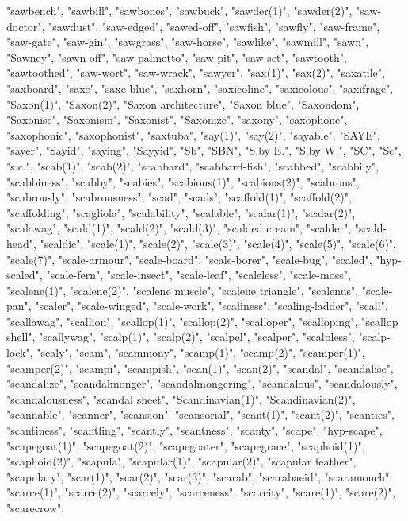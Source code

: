 "sawbench",
"sawbill",
"sawbones",
"sawbuck",
"sawder(1)",
"sawder(2)",
"saw-doctor",
"sawdust",
"saw-edged",
"sawed-off",
"sawfish",
"sawfly",
"saw-frame",
"saw-gate",
"saw-gin",
"sawgrass",
"saw-horse",
"sawlike",
"sawmill",
"sawn",
"Sawney",
"sawn-off",
"saw palmetto",
"saw-pit",
"saw-set",
"sawtooth",
"sawtoothed",
"saw-wort",
"saw-wrack",
"sawyer",
"sax(1)",
"sax(2)",
"saxatile",
"saxboard",
"saxe",
"saxe blue",
"saxhorn",
"saxicoline",
"saxicolous",
"saxifrage",
"Saxon(1)",
"Saxon(2)",
"Saxon architecture",
"Saxon blue",
"Saxondom",
"Saxonise",
"Saxonism",
"Saxonist",
"Saxonize",
"saxony",
"saxophone",
"saxophonic",
"saxophonist",
"saxtuba",
"say(1)",
"say(2)",
"sayable",
"SAYE",
"sayer",
"Sayid",
"saying",
"Sayyid",
"Sb",
"SBN",
"S.by E.",
"S.by W.",
"SC",
"Sc",
"s.c.",
"scab(1)",
"scab(2)",
"scabbard",
"scabbard-fish",
"scabbed",
"scabbily",
"scabbiness",
"scabby",
"scabies",
"scabious(1)",
"scabious(2)",
"scabrous",
"scabrously",
"scabrousness",
"scad",
"scads",
"scaffold(1)",
"scaffold(2)",
"scaffolding",
"scagliola",
"scalability",
"scalable",
"scalar(1)",
"scalar(2)",
"scalawag",
"scald(1)",
"scald(2)",
"scald(3)",
"scalded cream",
"scalder",
"scald-head",
"scaldic",
"scale(1)",
"scale(2)",
"scale(3)",
"scale(4)",
"scale(5)",
"scale(6)",
"scale(7)",
"scale-armour",
"scale-board",
"scale-borer",
"scale-bug",
"scaled",
"hyp-scaled",
"scale-fern",
"scale-insect",
"scale-leaf",
"scaleless",
"scale-moss",
"scalene(1)",
"scalene(2)",
"scalene muscle",
"scalene triangle",
"scalenus",
"scale-pan",
"scaler",
"scale-winged",
"scale-work",
"scaliness",
"scaling-ladder",
"scall",
"scallawag",
"scallion",
"scallop(1)",
"scallop(2)",
"scalloper",
"scalloping",
"scallop shell",
"scallywag",
"scalp(1)",
"scalp(2)",
"scalpel",
"scalper",
"scalpless",
"scalp-lock",
"scaly",
"scam",
"scammony",
"scamp(1)",
"scamp(2)",
"scamper(1)",
"scamper(2)",
"scampi",
"scampish",
"scan(1)",
"scan(2)",
"scandal",
"scandalise",
"scandalize",
"scandalmonger",
"scandalmongering",
"scandalous",
"scandalously",
"scandalousness",
"scandal sheet",
"Scandinavian(1)",
"Scandinavian(2)",
"scannable",
"scanner",
"scansion",
"scansorial",
"scant(1)",
"scant(2)",
"scanties",
"scantiness",
"scantling",
"scantly",
"scantness",
"scanty",
"scape",
"hyp-scape",
"scapegoat(1)",
"scapegoat(2)",
"scapegoater",
"scapegrace",
"scaphoid(1)",
"scaphoid(2)",
"scapula",
"scapular(1)",
"scapular(2)",
"scapular feather",
"scapulary",
"scar(1)",
"scar(2)",
"scar(3)",
"scarab",
"scarabaeid",
"scaramouch",
"scarce(1)",
"scarce(2)",
"scarcely",
"scarceness",
"scarcity",
"scare(1)",
"scare(2)",
"scarecrow",

